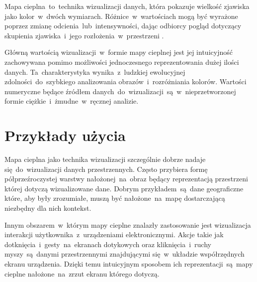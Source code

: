 Mapa cieplna~to~technika wizualizacji danych, która pokazuje wielkość zjawiska jako kolor~w~dwóch wymiarach. Różnice~w~wartościach mogą być wyrażone poprzez zmianę odcienia~lub~intensywności, dając odbiorcy pogląd dotyczący skupienia zjawiska~i~jego rozłożenia~w~przestrzeni \cite{Heat_map_definition}.

Główną wartością wizualizacji~w~formie mapy cieplnej jest jej intuicyjność zachowywana pomimo możliwości jednoczesnego reprezentowania dużej ilości danych. Ta~charakterystyka wynika~z~ludzkiej ewolucyjnej zdolności~do~szybkiego analizowania obrazów~i~rozróżniania kolorów. Wartości numeryczne będące źródłem danych~do~wizualizacji~są~w~nieprzetworzonej formie ciężkie~i~żmudne~w~ręcznej analizie.

\section{Przykłady użycia}
Mapa cieplna jako technika wizualizacji szczególnie dobrze nadaje się~do~wizualizacji danych przestrzennych. Często przybiera formę półprzeźroczystej warstwy nałożonej~na~obraz będący reprezentacją przestrzeni której dotyczą wizualizowane dane. Dobrym przykładem~są~dane geograficzne które, aby były zrozumiałe, muszą być nałożone~na~mapę dostarczającą niezbędny dla nich kontekst.

\bigskip
{}

Innym obszarem~w~którym mapy cieplne znalazły zastosowanie jest wizualizacja interakcji użytkownika~z~urządzeniami elektronicznymi. Akcje takie jak dotknięcia~i~gesty~na~ekranach dotykowych oraz kliknięcia~i~ruchy myszy~są~danymi przestrzennymi znajdującymi się~w~układzie współrzędnych ekranu urządzenia. Dzięki temu intuicyjnym  sposobem ich reprezentacji~są~mapy cieplne nałożone~na~zrzut ekranu którego dotyczą.

\bigskip
{}
